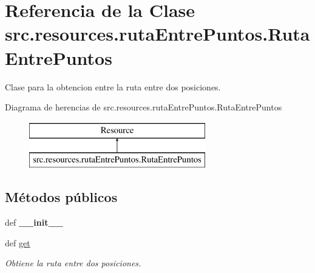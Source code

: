 \hypertarget{classsrc_1_1resources_1_1ruta_entre_puntos_1_1_ruta_entre_puntos}{\section{Referencia de la Clase src.\-resources.\-ruta\-Entre\-Puntos.\-Ruta\-Entre\-Puntos}
\label{classsrc_1_1resources_1_1ruta_entre_puntos_1_1_ruta_entre_puntos}
}


Clase para la obtencion entre la ruta entre dos posiciones.  


Diagrama de herencias de src.\-resources.\-ruta\-Entre\-Puntos.\-Ruta\-Entre\-Puntos\begin{figure}[H]
\begin{center}
\leavevmode
\includegraphics[height=2.000000cm]{classsrc_1_1resources_1_1ruta_entre_puntos_1_1_ruta_entre_puntos}
\end{center}
\end{figure}
\subsection*{Métodos públicos}
\begin{DoxyCompactItemize}
\item 
\hypertarget{classsrc_1_1resources_1_1ruta_entre_puntos_1_1_ruta_entre_puntos_a7fd0962af4dda6c52f4ab1ff6704614f}{def {\bfseries \-\_\-\-\_\-init\-\_\-\-\_\-}}\label{classsrc_1_1resources_1_1ruta_entre_puntos_1_1_ruta_entre_puntos_a7fd0962af4dda6c52f4ab1ff6704614f}

\item 
def \hyperlink{classsrc_1_1resources_1_1ruta_entre_puntos_1_1_ruta_entre_puntos_a14da5f2af9a498be67347a773d11164f}{get}
\begin{DoxyCompactList}\small\item\em Obtiene la ruta entre dos posiciones. \end{DoxyCompactList}\end{DoxyCompactItemize}
